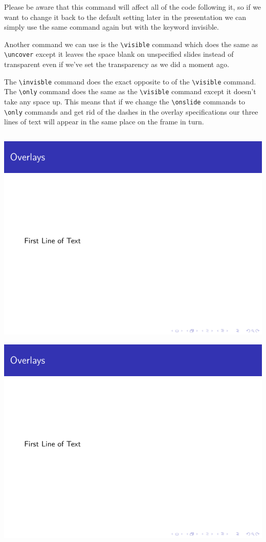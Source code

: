 \begin{column}{0.5\textwidth}
Please be aware that this command will affect all of the code following it, so if we want to change it back to the default setting later in the presentation we can simply use the same command again but with the keyword invisible.

Another command we can use is the \verb|\visible| command which does the same as \verb|\uncover| except it leaves the space blank on unspecified slides instead of transparent even if we've set the transparency as we did a moment ago.

The \verb|\invisble| command does the exact opposite to of the \verb|\visible| command. The \verb|\only| command does the same as the \verb|\visible| command except it doesn't take any space up. This means that if we change the \verb|\onslide| commands to \verb|\only| commands and get rid of the dashes in the overlay specifications our three lines of text will appear in the same place on the frame in turn.

\inputminted[linenos=true]{latex}{examples/beamer/beameroverlay06.tex}

\includegraphics[page=1]{examples/beamer/beameroverlay06.pdf}

\includegraphics[page=2]{examples/beamer/beameroverlay06.pdf}


\end{column}
